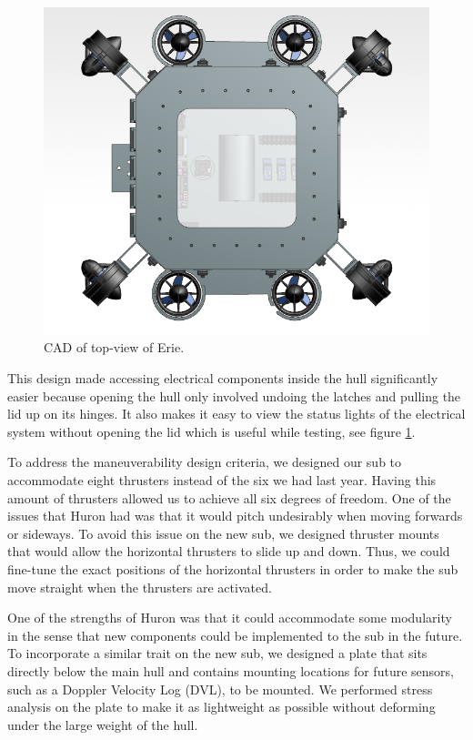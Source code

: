 \documentclass[conference]{IEEEtran}
\begin{document}
\begin{figure}[htbp]
    \centerline{\includegraphics[scale=0.35]{images/sub3.PNG}}
    \caption{CAD of top-view of Erie.}
    \label{fig:sub3}
\end{figure}

 This design made accessing electrical components inside the hull significantly easier because opening the hull only involved undoing the latches and pulling the lid up on its hinges. It also makes it easy to view the status lights of the electrical system without opening the lid which is useful while testing, see figure \ref{fig:sub3}.

To address the maneuverability design criteria, we designed our sub to accommodate eight thrusters instead of the six we had last year. Having this amount of thrusters allowed us to achieve all six degrees of freedom. One of the issues that Huron had was that it would pitch undesirably when moving forwards or sideways. To avoid this issue on the new sub, we designed thruster mounts that would allow the horizontal thrusters to slide up and down. Thus, we could fine-tune the exact positions of the horizontal thrusters in order to make the sub move straight when the thrusters are activated.

One of the strengths of Huron was that it could accommodate some modularity in the sense that new components could be implemented to the sub in the future. To incorporate a similar trait on the new sub, we designed a plate that sits directly below the main hull and contains mounting locations for future sensors, such as a Doppler Velocity Log (DVL), to be mounted. We performed stress analysis on the plate to make it as lightweight as possible without deforming under the large weight of the hull.
\end{document}

